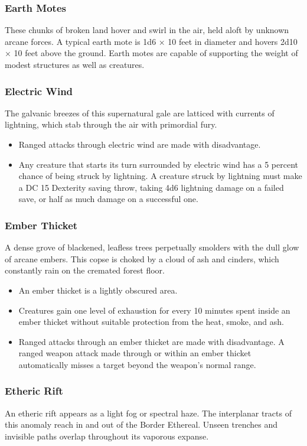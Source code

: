 \documentclass[10pt,a4paper,twoside,bg=print,twocolumn,openany,nodeprecatedcode]{dndbook}
\begin{document}
\subsubsection{Earth Motes}
These chunks of broken land hover and swirl in the air, held aloft by unknown arcane forces. A typical earth mote is 1d6 × 10 feet in diameter and hovers 2d10 × 10 feet above the ground. Earth motes are capable of supporting the weight of modest structures as well as creatures.

\subsubsection{Electric Wind}
The galvanic breezes of this supernatural gale are latticed with currents of lightning, which stab through the air with primordial fury.


\begin{itemize}
\item Ranged attacks through electric wind are made with disadvantage.
\item Any creature that starts its turn surrounded by electric wind has a 5 percent chance of being struck by lightning. A creature struck by lightning must make a DC 15 Dexterity saving throw, taking 4d6 lightning damage on a failed save, or half as much damage on a successful one.
\end{itemize}

\subsubsection{Ember Thicket}
A dense grove of blackened, leafless trees perpetually smolders with the dull glow of arcane embers. This copse is choked by a cloud of ash and cinders, which constantly rain on the cremated forest floor.


\begin{itemize}
\item An ember thicket is a lightly obscured area.
\item Creatures gain one level of exhaustion for every 10 minutes spent inside an ember thicket without suitable protection from the heat, smoke, and ash.
\item Ranged attacks through an ember thicket are made with disadvantage. A ranged weapon attack made through or within an ember thicket automatically misses a target beyond the weapon's normal range.
\end{itemize}

\subsubsection{Etheric Rift}
An etheric rift appears as a light fog or spectral haze. The interplanar tracts of this anomaly reach in and out of the Border Ethereal. Unseen trenches and invisible paths overlap throughout its vaporous expanse.
\end{document}
